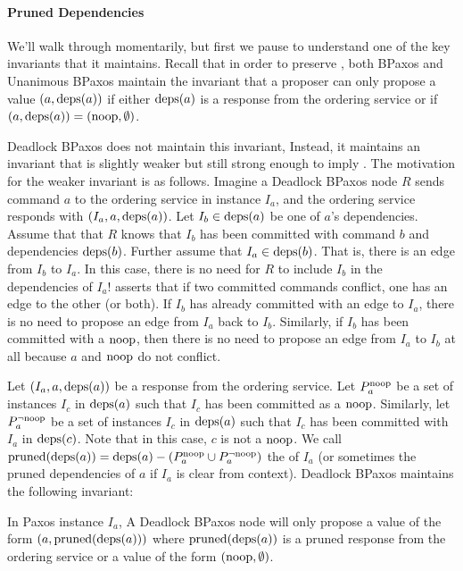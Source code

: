 \paragraph{Pruned Dependencies}
We'll walk through  momentarily, but first we pause to
understand one of the key invariants that it maintains. Recall that in order to
preserve , both BPaxos and Unanimous BPaxos maintain
the invariant that a proposer can only propose a value $(a, \text{deps}(a))$ if
either $\text{deps}(a)$ is a response from the ordering service or if $(a, \text{deps}(a))
= (\text{noop}, \emptyset)$.

Deadlock BPaxos does not maintain this invariant, Instead, it maintains an
invariant that is slightly weaker but still strong enough to imply
. The motivation for the weaker invariant is as
follows. Imagine a Deadlock BPaxos node $R$ sends command $a$ to the ordering
service in instance $I_a$, and the ordering service responds with $(I_a, a,
\text{deps}(a))$. Let $I_b \in \text{deps}(a)$ be one of $a$'s dependencies. Assume that
that $R$ knows that $I_b$ has been committed with command $b$ and dependencies
$\text{deps}(b)$. Further assume that $I_a \in \text{deps}(b)$. That is, there is an edge
from $I_b$ to $I_a$. In this case, there is no need for $R$ to include $I_b$ in
the dependencies of $I_a$!  asserts that if two
committed commands conflict, one has an edge to the other (or both). If $I_b$
has already committed with an edge to $I_a$, there is no need to propose an
edge from $I_a$ back to $I_b$.
%
Similarly, if $I_b$ has been committed with a $\text{noop}$, then there is no need to
propose an edge from $I_a$ to $I_b$ at all because $a$ and $\text{noop}$ do not
conflict.

\newcommand{\Pnoop}[1]{P^{\noop}_{#1}}
\newcommand{\Pnotnoop}[1]{P^{\lnot \noop}_{#1}}
\newcommand{\pruned}{\text{pruned}}
Let $(I_a, a, \text{deps}(a))$ be a response from the ordering service. Let
$\Pnoop{a}$ be a set of instances $I_c$ in $\text{deps}(a)$ such that $I_c$ has been
committed as a $\text{noop}$. Similarly, let $\Pnotnoop{a}$ be a set of instances
$I_c$ in $\text{deps}(a)$ such that $I_c$ has been committed with $I_a$ in
$\text{deps}(c)$. Note that in this case, $c$ is not a $\text{noop}$. We call
$\pruned(\deps{a}) = \deps{a} - (\Pnoop{a} \cup \Pnotnoop{a})$ the
 of $I_a$ (or sometimes the pruned dependencies of
$a$ if $I_a$ is clear from context).  Deadlock BPaxos maintains the following
invariant:

\begin{boxedinvariant}
  In Paxos instance $I_a$, A Deadlock BPaxos node will only propose a value of
  the form $(a, \pruned(\deps{a}))$ where $\pruned(\deps{a})$ is a pruned
  response from the ordering service or a value of the form $(\text{noop},
  \emptyset)$.
\end{boxedinvariant}


